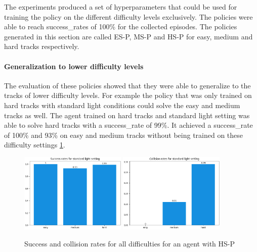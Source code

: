 The experiments produced a set of hyperparameters that could be used for training the policy on the different difficulty levels exclusively. The policies were able to reach success\_rates of 100\% for the collected episodes. The policies generated in this section are called \ac{ES-P}, \ac{MS-P} and \ac{HS-P} for easy, medium and hard tracks respectively.

\paragraph{Generalization to lower difficulty levels} 
The evaluation of these policies showed that they were able to generalize to the tracks of lower difficulty levels. For example the policy that was only trained on hard tracks with standard light conditions could solve the easy and medium tracks as well. The agent trained on hard tracks and standard light setting was able to solve hard tracks with a success\_rate of 99\%. It achieved a success\_rate of 100\% and 93\% on easy and medium tracks without being trained on these difficulty settings \ref{fig:hardDistance_generalization}.

\begin{figure}
    \centering
    \includegraphics[width=0.45\textwidth]{Bilder/notebook_images/hardDistanceStandardLight_eval_standard_success_rates_barplot.png}
    \includegraphics[width=0.45\textwidth]{Bilder/notebook_images/hardDistanceStandardLight_eval_standard_collision_rates_barplot.png}
    \caption{Success and collision rates for all difficulties for an agent with \ac{HS-P}}
    \label{fig:hardDistance_generalization}
\end{figure}

